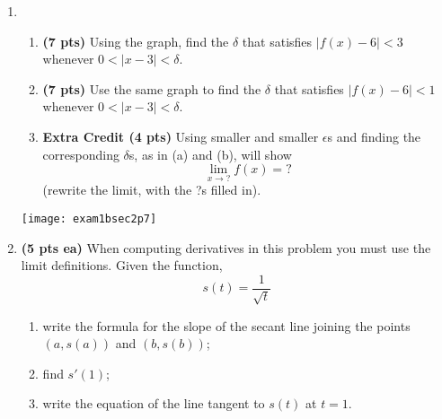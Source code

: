 \documentclass[12pt]{article}
\begin{document}
\begin{enumerate}
\begin{comment}
	\item {\bf Extra Credit (4 pts)} Using smaller and smaller $\epsilon$s and finding the corresponding $\delta$s, as in (a) and (b), will show 
	\[\lim_{x\to ?}f(x)=?.\]
	(rewrite the limit, with the ?s filled in).
	\vspace{6pc}
	\end{enumerate}  
\begin{center}\texttt{[image: exam1sec2p7]}\end{center}
\end{comment}
\item \begin{enumerate}\vspace{-2pc}
	\item {\bf (7 pts)} Using the graph, find the $\delta$ that satisfies $|f(x)-6|<3$ whenever $0<|x-3|<\delta$.
	\vspace{3pc}
	
	\item {\bf (7 pts)} Use the same graph to find the $\delta$ that satisfies $|f(x)-6|<1$ whenever $0<|x-3|<\delta$.
	\vspace{3pc}
	
	\item {\bf Extra Credit (4 pts)} Using smaller and smaller $\epsilon$s and finding the corresponding $\delta$s, as in (a) and (b), will show 
	\[\lim_{x\to ?}f(x)=?\]
	(rewrite the limit, with the ?s filled in).
	\vspace{5pc}
	\end{enumerate}  
\begin{center}\texttt{[image: exam1bsec2p7]}\end{center}

\newpage
\item {\bf (5 pts ea)} When computing derivatives in this problem you must use the limit definitions.  Given the function,
\[s(t)=\frac{1}{\sqrt{t}}\]
	\begin{enumerate}
	\item write the formula for the slope of the secant line joining the points $(a,s(a))$ and $(b,s(b))$;
	\vspace{14pc}
	
	\item find $s'(1)$;
	\vspace{14pc}
	
	\item write the equation of the line tangent to $s(t)$ at $t=1$.
	\end{enumerate}
	

\end{enumerate}
\end{document}
